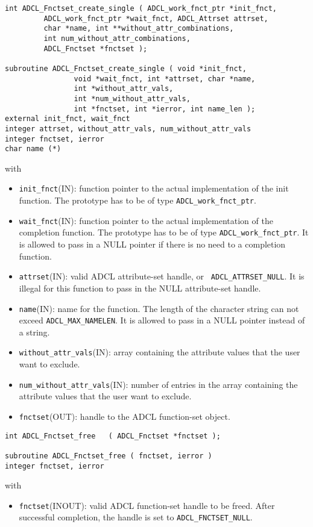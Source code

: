 \begin{verbatim}
int ADCL_Fnctset_create_single ( ADCL_work_fnct_ptr *init_fnct,
         ADCL_work_fnct_ptr *wait_fnct, ADCL_Attrset attrset, 
         char *name, int **without_attr_combinations, 
         int num_without_attr_combinations, 
         ADCL_Fnctset *fnctset );

subroutine ADCL_Fnctset_create_single ( void *init_fnct, 
                void *wait_fnct, int *attrset, char *name,
                int *without_attr_vals, 
                int *num_without_attr_vals,
                int *fnctset, int *ierror, int name_len );
external init_fnct, wait_fnct
integer attrset, without_attr_vals, num_without_attr_vals
integer fnctset, ierror
char name (*)
\end{verbatim}
with
\begin{itemize}
\item {\tt init\_fnct}(IN): function pointer to the actual implementation of
  the init function. The prototype has to be of type {\tt ADCL\_work\_fnct\_ptr}.
\item {\tt wait\_fnct}(IN): function pointer to the actual implementation of
  the completion function. The prototype has to be of type {\tt ADCL\_work\_fnct\_ptr}.
  It is allowed to pass in a NULL pointer if there is no need to a completion function.
\item {\tt attrset}(IN): valid ADCL attribute-set handle, or {\tt
    ADCL\_ATTRSET\_NULL}. It is illegal for this function to pass in the NULL attribute-set 
    handle.
\item {\tt name}(IN): name for the function. The length of the character string can not exceed 
  {\tt ADCL\_MAX\_NAMELEN}. It is allowed to pass in a NULL pointer instead of a string.
\item {\tt without\_attr\_vals}(IN): array containing the attribute values that the user want to exclude.
\item {\tt num\_without\_attr\_vals}(IN): number of entries in the array containing the attribute values that the user want to exclude.
\item {\tt fnctset}(OUT): handle to the ADCL function-set object.
\end{itemize}
\hspace{1cm}
\begin{verbatim}
int ADCL_Fnctset_free   ( ADCL_Fnctset *fnctset );

subroutine ADCL_Fnctset_free ( fnctset, ierror )
integer fnctset, ierror
\end{verbatim}
with
\begin{itemize}
\item {\tt fnctset}(INOUT): valid ADCL function-set handle to be freed. After successful completion, the handle is set to {\tt ADCL\_FNCTSET\_NULL}.
\end{itemize}


